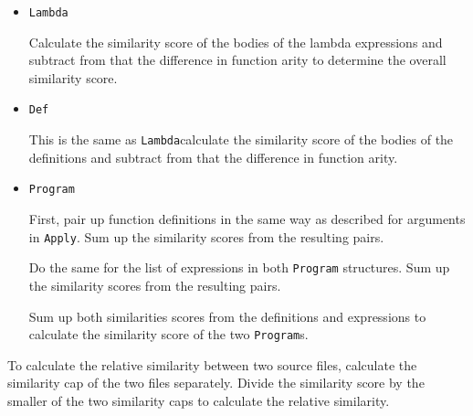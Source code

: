 \documentclass[12pt]{article}
\newcommand{\key}[1]{\texttt{#1}}
\begin{document}
\begin{itemize}
\begin{adjustwidth}{5mm}{}
      Take the first argument from \key{args1}. Compare it to each argument from \key{args2} and pick the argument that has the highest similarity score. Remove that argument from \key{args2}.

      Take the next argument from \key{args1} and repeat the previous step again.

      Do so until all pairings have been made. Sum up the similarity scores from the resulting pairs and the similarity score of the applied functions to achieve a tentative similarity score.

      If there are excess unpaired arguments, sum up the similarity caps of the excess arguments and subtract that from the tentative score above (with a minimum total score value of 0). The resulting value is the similarity score of the \key{Apply} structures.
    \end{adjustwidth}

  \item\key{Lambda}
    \begin{adjustwidth}{5mm}{}
      Calculate the similarity score of the bodies of the lambda expressions and subtract from that the difference in function arity to determine the overall similarity score.
    \end{adjustwidth}

  \item\key{Def}
    \begin{adjustwidth}{5mm}{}
      This is the same as \key{Lambda}\textemdash calculate the similarity score of the bodies of the definitions and subtract from that the difference in function arity.
    \end{adjustwidth}

  \item\key{Program}
    \begin{adjustwidth}{5mm}{}
      First, pair up function definitions in the same way as described for arguments in \key{Apply}. Sum up the similarity scores from the resulting pairs.

      Do the same for the list of expressions in both \key{Program} structures. Sum up the similarity scores from the resulting pairs.

      Sum up both similarities scores from the definitions and expressions to calculate the similarity score of the two \key{Program}s.
    \end{adjustwidth}
  \end{itemize}

  To calculate the relative similarity between two source files, calculate the similarity cap of the two files separately. Divide the similarity score by the smaller of the two similarity caps to calculate the relative similarity.
\end{document}

